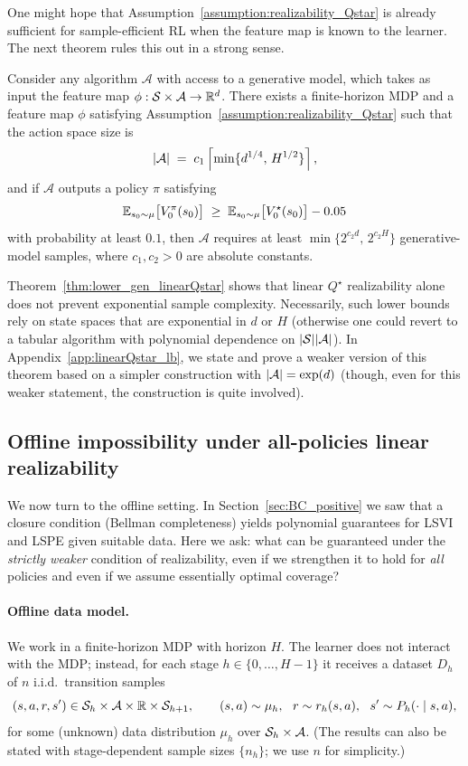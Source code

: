 One might hope that Assumption~\ref{assumption:realizability_Qstar} is already
sufficient for sample-efficient RL when the feature map is known to the learner.
The next theorem rules this out in a strong sense.

\begin{theorem}
\label{thm:lower_gen_linearQstar}
Consider any algorithm $\mathcal{A}$ with access to a generative model, which
takes as input the feature map $\phi:\mathcal{S}\times\mathcal{A}\to\mathbb{R}^d$.  There exists a
finite-horizon MDP and a feature map $\phi$ satisfying
Assumption~\ref{assumption:realizability_Qstar} such that the action space size is
\[
|\mathcal{A}|
\;=\;
c_1\left\lceil \min\{d^{1/4},\,H^{1/2}\}\right\rceil,
\]
and if $\mathcal{A}$ outputs a policy $\pi$ satisfying
\[
\mathbb{E}_{s_0\sim\mu}\big[V^\pi_0(s_0)\big]
\;\ge\;
\mathbb{E}_{s_0\sim\mu}\big[V^\star_0(s_0)\big] - 0.05
\]
with probability at least $0.1$, then $\mathcal{A}$ requires at least
$\min\{2^{c_2 d},\,2^{c_2 H}\}$ generative-model samples, where $c_1,c_2>0$ are
absolute constants.
\end{theorem}

Theorem~\ref{thm:lower_gen_linearQstar} shows that linear $Q^\star$ realizability
alone does not prevent exponential sample complexity. Necessarily, such lower
bounds rely on state spaces that are exponential in $d$ or $H$ (otherwise one
could revert to a tabular algorithm with polynomial dependence on $|\mathcal{S}||\mathcal{A}|$).
In Appendix~\ref{app:linearQstar_lb}, we state and prove a weaker
version of this theorem based on a simpler construction with
$|\mathcal{A}|=\exp(d)$ (though, even for this weaker statement, the construction is
quite involved).

\subsection{Offline impossibility under all-policies linear realizability}
\label{subsec:offline_all_policies_realizability}

We now turn to the offline setting.  In Section~\ref{sec:BC_positive} we saw that
a closure condition (Bellman completeness) yields polynomial guarantees for LSVI
and LSPE given suitable data.  Here we ask: what can be guaranteed under the
\emph{strictly weaker} condition of realizability, even if we strengthen it to
hold for \emph{all} policies and even if we assume essentially optimal coverage?

\paragraph{Offline data model.}
We work in a finite-horizon MDP with horizon $H$.  The learner does not interact
with the MDP; instead, for each stage $h\in\{0,\dots,H-1\}$ it receives a dataset
$D_h$ of $n$ i.i.d.\ transition samples
\[
(s,a,r,s')\in \mathcal{S}_h\times\mathcal{A}\times\mathbb{R}\times \mathcal{S}_{h+1},
\qquad (s,a)\sim \mu_h,\ \ r\sim r_h(s,a),\ \ s'\sim P_h(\cdot\mid s,a),
\]
for some (unknown) data distribution $\mu_h$ over $\mathcal{S}_h\times\mathcal{A}$.  (The
results can also be stated with stage-dependent sample sizes $\{n_h\}$; we use $n$
for simplicity.)

